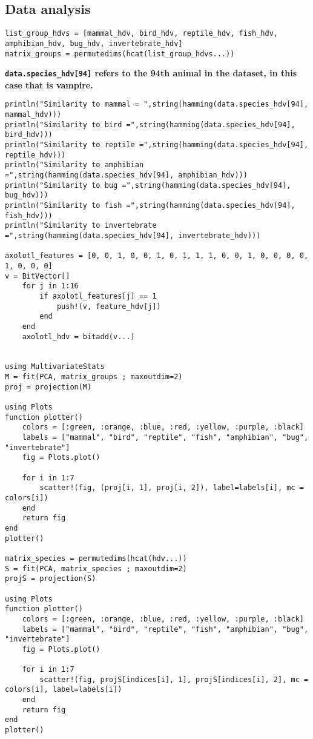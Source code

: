 \subsection{Data analysis}
\begin{verbatim}
list_group_hdvs = [mammal_hdv, bird_hdv, reptile_hdv, fish_hdv, amphibian_hdv, bug_hdv, invertebrate_hdv]
matrix_groups = permutedims(hcat(list_group_hdvs...))
\end{verbatim}
\textbf{\texttt{data.species_hdv[94]} refers to the 94th animal in the dataset, in this case that is vampire.}
\begin{verbatim}
println("Similarity to mammal = ",string(hamming(data.species_hdv[94], mammal_hdv)))
println("Similarity to bird =",string(hamming(data.species_hdv[94], bird_hdv)))
println("Similarity to reptile =",string(hamming(data.species_hdv[94], reptile_hdv)))
println("Similarity to amphibian =",string(hamming(data.species_hdv[94], amphibian_hdv)))
println("Similarity to bug =",string(hamming(data.species_hdv[94], bug_hdv)))
println("Similarity to fish =",string(hamming(data.species_hdv[94], fish_hdv)))
println("Similarity to invertebrate =",string(hamming(data.species_hdv[94], invertebrate_hdv)))

axolotl_features = [0, 0, 1, 0, 0, 1, 0, 1, 1, 1, 0, 0, 1, 0, 0, 0, 0, 1, 0, 0, 0]
v = BitVector[]
    for j in 1:16
        if axolotl_features[j] == 1
            push!(v, feature_hdv[j])
        end
    end
    axolotl_hdv = bitadd(v...)


using MultivariateStats
M = fit(PCA, matrix_groups ; maxoutdim=2)
proj = projection(M)

using Plots
function plotter()
    colors = [:green, :orange, :blue, :red, :yellow, :purple, :black]
    labels = ["mammal", "bird", "reptile", "fish", "amphibian", "bug", "invertebrate"]
    fig = Plots.plot()

    for i in 1:7
        scatter!(fig, (proj[i, 1], proj[i, 2]), label=labels[i], mc = colors[i])
    end
    return fig
end
plotter()

matrix_species = permutedims(hcat(hdv...))
S = fit(PCA, matrix_species ; maxoutdim=2)
projS = projection(S)

using Plots
function plotter()
    colors = [:green, :orange, :blue, :red, :yellow, :purple, :black]
    labels = ["mammal", "bird", "reptile", "fish", "amphibian", "bug", "invertebrate"]
    fig = Plots.plot()

    for i in 1:7
        scatter!(fig, projS[indices[i], 1], projS[indices[i], 2], mc = colors[i], label=labels[i])
    end
    return fig
end
plotter()
\end{verbatim}
